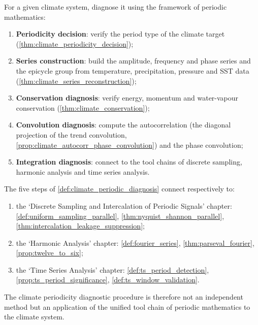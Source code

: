 \begin{definition}\label{def:climate_periodic_diagnosis}
For a given climate system, diagnose it using the framework of periodic mathematics:
\begin{enumerate}[label=(\roman*)]
    \item \textbf{Periodicity decision}: verify the period type of the climate target (\cref{thm:climate_periodicity_decision});
    \item \textbf{Series construction}: build the amplitude, frequency and phase series and the epicycle group from temperature, precipitation, pressure and SST data (\cref{thm:climate_series_reconstruction});
    \item \textbf{Conservation diagnosis}: verify energy, momentum and water-vapour conservation (\cref{thm:climate_conservation});
    \item \textbf{Convolution diagnosis}: compute the autocorrelation (the diagonal projection of the trend convolution, \cref{prop:climate_autocorr_phase_convolution}) and the phase convolution;
    \item \textbf{Integration diagnosis}: connect to the tool chains of discrete sampling, harmonic analysis and time series analysis.
\end{enumerate}
\end{definition}

\begin{theorem}\label{thm:climate_diagnosis_integration}
The five steps of \cref{def:climate_periodic_diagnosis} connect respectively to:
\begin{enumerate}[label=(\roman*)]
    \item the `Discrete Sampling and Intercalation of Periodic Signals' chapter: \cref{def:uniform_sampling_parallel}, \cref{thm:nyquist_shannon_parallel}, \cref{thm:intercalation_leakage_suppression};
    \item the `Harmonic Analysis' chapter: \cref{def:fourier_series}, \cref{thm:parseval_fourier}, \cref{prop:twelve_to_six};
    \item the `Time Series Analysis' chapter: \cref{def:ts_period_detection}, \cref{prop:ts_period_significance}, \cref{def:ts_window_validation}.
\end{enumerate}
The climate periodicity diagnostic procedure is therefore not an independent method but an application of the unified tool chain of periodic mathematics to the climate system.
\end{theorem}

